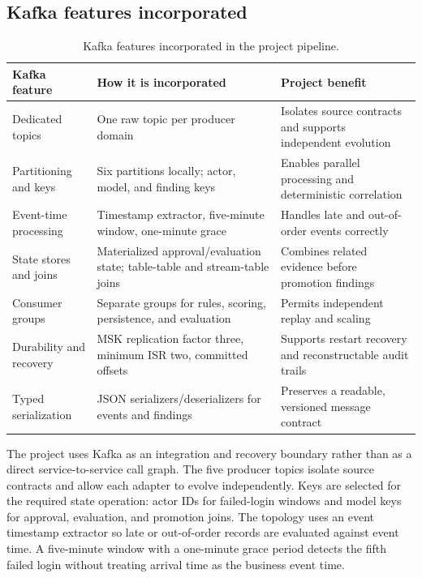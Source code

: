 \documentclass[12pt,oneside]{report}
\begin{document}
\subsection{Kafka features incorporated}
\begin{table}[H]\centering\small\begin{tabular}{|p{3.0cm}|p{4.4cm}|p{3.8cm}|}\hline
\textbf{Kafka feature} & \textbf{How it is incorporated} & \textbf{Project benefit}\\\hline
Dedicated topics & One raw topic per producer domain & Isolates source contracts and supports independent evolution\\\hline
Partitioning and keys & Six partitions locally; actor, model, and finding keys & Enables parallel processing and deterministic correlation\\\hline
Event-time processing & Timestamp extractor, five-minute window, one-minute grace & Handles late and out-of-order events correctly\\\hline
State stores and joins & Materialized approval/evaluation state; table-table and stream-table joins & Combines related evidence before promotion findings\\\hline
Consumer groups & Separate groups for rules, scoring, persistence, and evaluation & Permits independent replay and scaling\\\hline
Durability and recovery & MSK replication factor three, minimum ISR two, committed offsets & Supports restart recovery and reconstructable audit trails\\\hline
Typed serialization & JSON serializers/deserializers for events and findings & Preserves a readable, versioned message contract\\\hline
\end{tabular}\caption{Kafka features incorporated in the project pipeline.}\label{tab:kafka-features}\end{table}
The project uses Kafka as an integration and recovery boundary rather than as a direct service-to-service call graph. The five producer topics isolate source contracts and allow each adapter to evolve independently. Keys are selected for the required state operation: actor IDs for failed-login windows and model keys for approval, evaluation, and promotion joins. The topology uses an event timestamp extractor so late or out-of-order records are evaluated against event time. A five-minute window with a one-minute grace period detects the fifth failed login without treating arrival time as the business event time.
\end{document}
